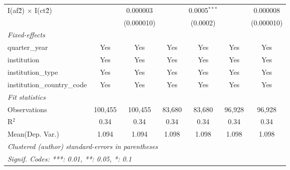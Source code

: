 \begin{tabular}{lcccccc}
   I(af\^2) $\times$ I(ct\^2)         &               & 0.000003       &               & 0.0005$^{***}$ &               & 0.000008\\   
                                      &               & (0.000010)     &               & (0.0002)       &               & (0.000010)\\   
   \midrule
   \emph{Fixed-effects}\\
   quarter\_year                      & Yes           & Yes            & Yes           & Yes            & Yes           & Yes\\  
   institution                        & Yes           & Yes            & Yes           & Yes            & Yes           & Yes\\  
   institution\_type                  & Yes           & Yes            & Yes           & Yes            & Yes           & Yes\\  
   institution\_country\_code         & Yes           & Yes            & Yes           & Yes            & Yes           & Yes\\  
   \midrule
   \emph{Fit statistics}\\
   Observations                       & 100,455       & 100,455        & 83,680        & 83,680         & 96,928        & 96,928\\  
   R$^2$                              & 0.34          & 0.34           & 0.34          & 0.34           & 0.34          & 0.34\\  
Mean(Dep. Var.) & 1.094 & 1.094 & 1.098 & 1.098 & 1.098 & 1.098 \\
   \midrule \midrule
   \multicolumn{7}{l}{\emph{Clustered (author) standard-errors in parentheses}}\\
   \multicolumn{7}{l}{\emph{Signif. Codes: ***: 0.01, **: 0.05, *: 0.1}}\\
\end{tabular}
\par\endgroup
